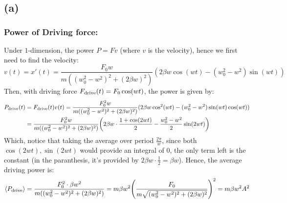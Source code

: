 \documentclass{article}
\DeclarePairedDelimiter{\paran}{(}{)}%
\DeclarePairedDelimiter{\bracket}{\langle}{\rangle}
\begin{document}
\subsection*{(a)}
\subsubsection*{Power of Driving force:}
Under $1$-dimension, the power $P = Fv$ (where $v$ is the velocity), hence we first need to find the velocity:
\begin{equation}
    v(t)=x'(t) = \frac{F_0w}{m((w_0^2-w^2)^2+(2\beta w)^2)}(2\beta w\cos(wt)-(w_0^2-w^2)\sin(wt))
\end{equation}
Then, with driving force $F_{\textmd{drive}}(t)=F_0\cos(wt)$, the power is given by:
\begin{align}
    P_{\textmd{drive}}(t)&=F_{\textmd{drive}}(t)v(t) = \frac{F_0^2w}{m((w_0^2-w^2)^2+(2\beta w)^2)}(2\beta w\cos^2(wt)-(w_0^2-w^2)\sin(wt)\cos(wt))\\
    &=\frac{F_0^2w}{m((w_0^2-w^2)^2+(2\beta w)^2)}\paran*{2\beta w\cdot\frac{1+\cos(2wt)}{2}-\frac{w_0^2-w^2}{2}\sin(2wt)}
\end{align}
Which, notice that taking the average over period $\frac{2\pi}{w}$, since both $\cos(2wt),\sin(2wt)$ would provide an integral of $0$, the only term left is the constant (in the paranthesis, it's provided by $2\beta w \cdot \frac{1}{2}=\beta w$). Hence, the average driving power is:
\begin{equation}
    \bracket*{P_{\textmd{drive}}} = \frac{F_0^2\cdot\beta w^2}{m((w_0^2-w^2)^2+(2\beta w)^2)} = m\beta w^2\paran*{\frac{F_0}{m\sqrt{(w_0^2-w^2)^2+(2\beta w)^2}}}^2 = m\beta w^2A^2
\end{equation}
\end{document}
